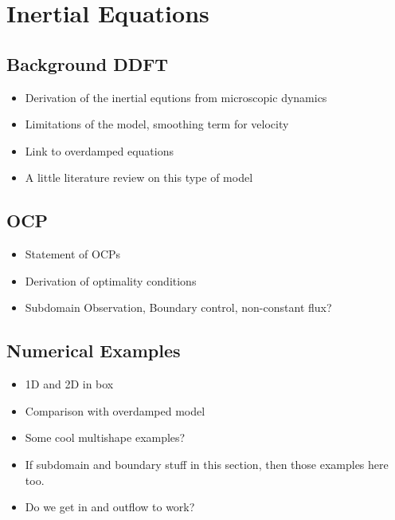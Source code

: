 \documentclass[11pt, a4paper]{article}
\theoremstyle{definition}
\begin{document}
	
	
	
	
	

	\section{Inertial Equations}
	\subsection{Background DDFT}
		\begin{itemize}
			\item Derivation of the inertial equtions from microscopic dynamics
			\item Limitations of the model, smoothing term for velocity
			\item Link to overdamped equations
			\item A little literature review on this type of model
		\end{itemize}
	
	
	\subsection{OCP}
		\begin{itemize}
			\item Statement of OCPs 
			\item Derivation of optimality conditions
			\item Subdomain Observation, Boundary control, non-constant flux?
		\end{itemize}
	\label{sec:INOptimalityConditions}
	
	
	\subsection{Numerical Examples}
		\begin{itemize}
			\item 1D and 2D in box
			\item Comparison with overdamped model
			\item Some cool multishape examples?
			\item If subdomain and boundary stuff in this section, then those examples here too.
			\item Do we get in and outflow to work?
		\end{itemize}
		
\end{document}

